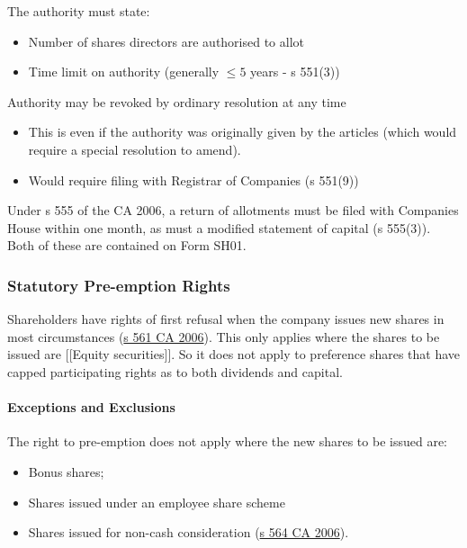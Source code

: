 \documentclass[
]{article}
\providecommand{\tightlist}{%
  \setlength{\itemsep}{0pt}\setlength{\parskip}{0pt}}
\begin{document}
The authority must state:

\begin{itemize}
\tightlist
\item
  Number of shares directors are authorised to allot
\item
  Time limit on authority (generally \(\leq 5\) years - s 551(3))
\end{itemize}

Authority may be revoked by ordinary resolution at any time

\begin{itemize}
\tightlist
\item
  This is even if the authority was originally given by the articles
  (which would require a special resolution to amend).
\item
  Would require filing with Registrar of Companies (s 551(9))
\end{itemize}

Under s 555 of the CA 2006, a return of allotments must be filed with
Companies House within one month, as must a modified statement of
capital (s 555(3)). Both of these are contained on Form SH01.

\hypertarget{statutory-pre-emption-rights}{%
\subsubsection{Statutory Pre-emption
Rights}\label{statutory-pre-emption-rights}}

Shareholders have rights of first refusal when the company issues new
shares in most circumstances
(\href{https://www.legislation.gov.uk/ukpga/2006/46/section/561}{s 561
CA 2006}). This only applies where the shares to be issued are
{[}{[}Equity securities{]}{]}. So it does not apply to preference shares
that have capped participating rights as to both dividends and capital.

\hypertarget{exceptions-and-exclusions}{%
\paragraph{Exceptions and Exclusions}\label{exceptions-and-exclusions}}

The right to pre-emption does not apply where the new shares to be
issued are:

\begin{itemize}
\tightlist
\item
  Bonus shares;
\item
  Shares issued under an employee share scheme
\item
  Shares issued for non-cash consideration
  (\href{https://www.legislation.gov.uk/ukpga/2006/46/section/564}{s 564
  CA 2006}).
\end{itemize}
\end{document}
